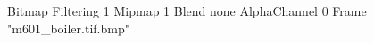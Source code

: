 {Bitmap
	{Filtering 1}
	{Mipmap 1}
	{Blend none}
	{AlphaChannel 0}
	{Frame "m601_boiler.tif.bmp"}
}
